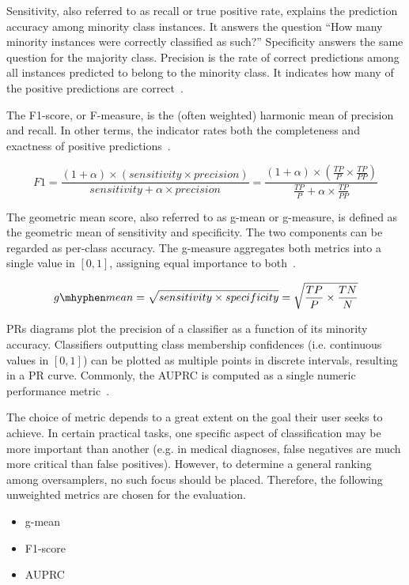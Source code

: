 \documentclass[sort&compress]{elsarticle}
\begin{document}
	 Sensitivity, also referred to as recall or true positive rate, explains the prediction accuracy among minority class instances. It answers the question ``How many minority instances were correctly classified as such?'' Specificity answers the same question for the majority class. Precision is the rate of correct predictions among all instances predicted to belong to the minority class. It indicates how many of the positive predictions are correct~\citep{He.2009}.

	 The F1-score, or F-measure, is the (often weighted) harmonic mean of precision and recall. In other terms, the indicator rates both the completeness and exactness of positive predictions~\citep{He.2009,Japkowicz.2013}.
	 
	\begin{equation}
	F1 = \frac{(1 + \alpha) \times (sensitivity \times precision)}{sensitivity + \alpha \times precision} 
	= \frac{(1 + \alpha) \times (\frac{TP}{P} \times \frac{TP}{PP})}{\frac{TP}{P} + \alpha \times \frac{TP}{PP} }
	\end{equation}

	The geometric mean score, also referred to as g-mean or g-measure, is defined as the geometric mean of sensitivity and specificity. The two components can be regarded as per-class accuracy. The g-measure aggregates both metrics into a single value in $[0,1]$, assigning equal importance to both~\citep{He.2009,Japkowicz.2013}.
	
	\begin{equation}
	g\mhyphen mean = \sqrt{sensitivity \times specificity} 
	= \sqrt{\frac{TP}{P} \times \frac{TN}{N}}
	\end{equation}

	\acp{PR} diagrams plot the precision of a classifier as a function of its minority accuracy. Classifiers outputting class membership confidences (i.e. continuous values in $[0,1]$) can be plotted as multiple points in discrete intervals, resulting in a \ac{PR} curve. Commonly, the \ac{AUPRC} is computed as a single numeric performance metric~\citep{He.2009,Japkowicz.2013}.
	
	The choice of metric depends to a great extent on the goal their user seeks to achieve. In certain practical tasks, one specific aspect of classification may be more important than another (e.g. in medical diagnoses, false negatives are much more critical than false positives). However, to determine a general ranking among oversamplers, no such focus should be placed. Therefore, the following unweighted metrics are chosen for the evaluation.
    \begin{itemize}
    	\item g-mean
        \item F1-score
		\item \ac{AUPRC}
	\end{itemize}
   
\end{document}
